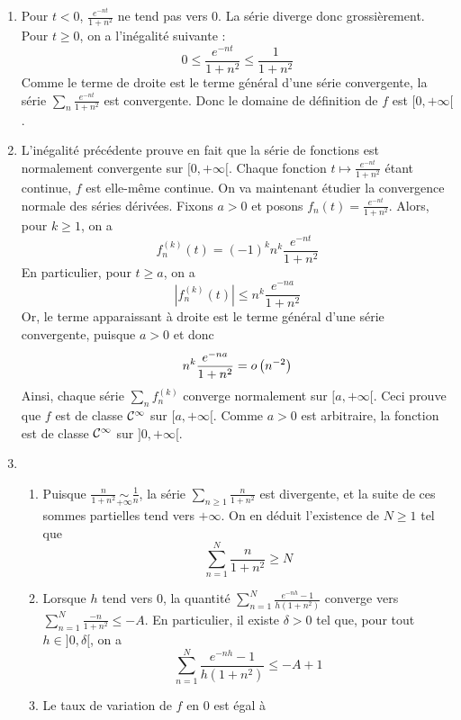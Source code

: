 \begin{enumerate}
    \item Pour $t<0$, $\frac{e^{-nt}}{1+n^2}$ ne tend pas vers 0. La série diverge donc grossièrement. Pour $t\geqslant 0$, on a l'inégalité suivante :
        \[
            0\leqslant\frac{e^{-nt}}{1+n^2}\leqslant \frac{1}{1+n^2}
        \]
        Comme le terme de droite est le terme général d'une série convergente, la série $\sum\limits_n \frac{e^{-nt}}{1+n^2}$ est convergente. Donc le domaine de définition de $f$ est $[0,+\infty[$.
    \item L'inégalité précédente prouve en fait que la série de fonctions est normalement convergente sur $[0,+\infty[$. Chaque fonction $t\mapsto \frac{e^{-nt}}{1+n^2}$ étant continue, $f$ est elle-même continue. On va maintenant étudier la convergence normale des séries dérivées. Fixons $a>0$ et posons $f_n(t)=\frac{e^{-nt}}{1+n^2}$. Alors, pour $k\geqslant 1$, on a 
        \[
            f_n^{(k)}(t)=(-1)^k n^k \frac{e^{-nt}}{1+n^2}
        \]
        En particulier, pour $t\geqslant a$, on a 
        \[
            \left|f_n^{(k)}(t)\right|\leqslant n^k\frac{e^{-na}}{1+n^2}
        \]
        Or, le terme apparaissant à droite est le terme général d'une série convergente, puisque $a>0$ et donc
        \[
            n^k \frac{e^{-na}}{1+n^2}=o\left(n^{-2}\right)
        \]
        Ainsi, chaque série $\sum\limits_n f_n^{(k)}$ converge normalement sur $[a,+\infty[$. Ceci prouve que $f$ est de classe $\mathcal{C}^\infty$ sur $[a,+\infty[$. Comme $a>0$ est arbitraire, la fonction est de classe $\mathcal{C}^\infty$ sur $]0,+\infty[$.
        \item
            \begin{enumerate}
                \item Puisque $\frac{n}{1+n^2}\underset{+\infty}{\sim}\frac{1}{n}$, la série $\sum\limits_{n\geqslant 1}\frac{n}{1+n^2}$ est divergente, et la suite de ces sommes partielles tend vers $+\infty$. On en déduit l'existence de $N\geqslant 1$ tel que 
                    \[
                        \sum\limits_{n=1}^N\frac{n}{1+n^2}\geqslant N
                    \]
                \item Lorsque $h$ tend vers 0, la quantité $\sum\limits_{n=1}^N \frac{e^{-nh}-1}{h(1+n^2)}$ converge vers $\sum\limits_{n=1}^N \frac{-n}{1+n^2}\leqslant -A$. En particulier, il existe $\delta>0$ tel que, pour tout $h\in]0,\delta[$, on a
                    \[
                        \sum\limits_{n=1}^N \frac{e^{-nh}-1}{h(1+n^2)}\leqslant -A+1
                    \]
                \item Le taux de variation de $f$ en 0 est égal à 

\end{enumerate}
\end{enumerate}
